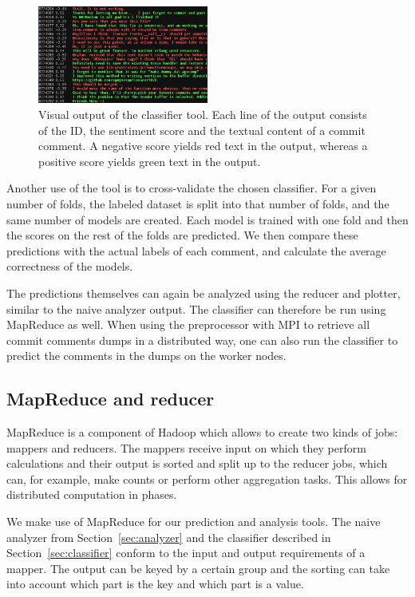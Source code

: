 \documentclass{article}
\begin{document}
\begin{figure}[h!]
  \centering
  \includegraphics[width=0.5\textwidth]{Images/Classifier.png}
  \caption{Visual output of the classifier tool. Each line of the output
           consists of the ID, the sentiment score and the textual content of
           a commit comment. A negative score yields red text in the output,
           whereas a positive score yields green text in the
           output.}\label{fig:classifier-output}
\end{figure}

Another use of the tool is to cross-validate the chosen classifier. For a given 
number of folds, the labeled dataset is split into that number of folds, and 
the same number of models are created. Each model is trained with one fold and 
then the scores on the rest of the folds are predicted. We then compare these 
predictions with the actual labels of each comment, and calculate the average 
correctness of the models.

The predictions themselves can again be analyzed using the reducer and plotter, 
similar to the naive analyzer output. The classifier can therefore be run using 
MapReduce as well. When using the preprocessor with MPI to retrieve all commit 
comments dumps in a distributed way, one can also run the classifier to predict
the comments in the dumps on the worker nodes.

\subsection{MapReduce and reducer}\label{sec:reducer}
MapReduce is a component of Hadoop which allows to create two kinds of jobs: 
mappers and reducers. The mappers receive input on which they perform 
calculations and their output is sorted and split up to the reducer jobs, which 
can, for example, make counts or perform other aggregation tasks. This allows 
for distributed computation in phases.

We make use of MapReduce for our prediction and analysis tools. The naive 
analyzer from Section~\ref{sec:analyzer} and the classifier described in 
Section~\ref{sec:classifier} conform to the input and output requirements of 
a mapper. The output can be keyed by a certain group and the sorting can take 
into account which part is the key and which part is a value.
\end{document}
